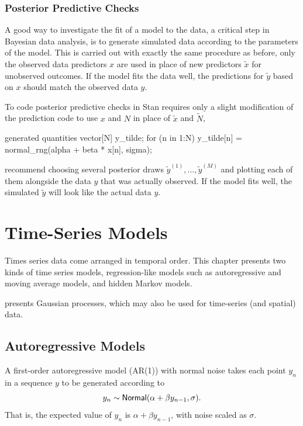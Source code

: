 \subsection{Posterior Predictive Checks}

A good way to investigate the fit of a model to the data, a critical
step in Bayesian data analysis, is to generate simulated data
according to the parameters of the model.  This is carried out with
exactly the same procedure as before, only the observed data
predictors $x$ are used in place of new predictors $\tilde{x}$ for
unobserved outcomes.  If the model fits the data well, the predictions
for $\tilde{y}$ based on $x$ should match the observed data $y$.

To code posterior predictive checks in Stan requires only a slight
modification of the prediction code to use $x$ and $N$ in place of
$\tilde{x}$ and $\tilde{N}$,
%
\begin{stancode}
generated quantities {
  vector[N] y_tilde;
  for (n in 1:N)
    y_tilde[n] = normal_rng(alpha + beta * x[n], sigma);
}
\end{stancode}
%
\cite{GelmanEtAl:2013} recommend choosing several posterior draws
$\tilde{y}^{(1)}, \ldots, \tilde{y}^{(M)}$ and plotting each of them
alongside the data $y$ that was actually observed.  If the model fits
well, the simulated $\tilde{y}$ will look like the actual data $y$.




\chapter{Time-Series Models}\label{time-series.chapter}

\noindent
Times series data come arranged in temporal order.  This chapter
presents two kinds of time series models, regression-like models such
as autoregressive and moving average models, and hidden Markov models. 

 presents Gaussian processes, which may
also be used for time-series (and spatial) data.


\section{Autoregressive Models}\label{autoregressive.section}

A first-order autoregressive model (AR(1)) with normal noise takes
each point $y_n$ in a sequence $y$ to be generated according to
%
\[
y_n \sim \distro{Normal}(\alpha + \beta y_{n-1}, \sigma).
\]
%
That is, the expected value of $y_n$ is $\alpha + \beta y_{n-1}$, with
noise scaled as $\sigma$.

